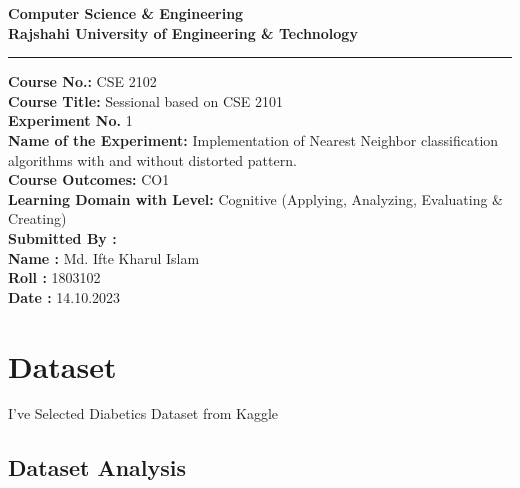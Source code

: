 \documentclass[12pt]{article}
\begin{document}
\thispagestyle{empty}
\begin{center}

\vspace{-12pt}
\end{center}
\setlength{\parskip}{0cm}

\begin{center}


\textbf{Computer Science \& Engineering\\
Rajshahi University of Engineering \& Technology}
\end{center}


\hrule 
\vspace{10pt}

\textbf{Course No.:} CSE 2102\\[1pt]
\textbf{Course Title:} Sessional based on CSE 2101\\[1pt]

\textbf{Experiment No.} 1\\[1pt]

\textbf{Name of the Experiment:} Implementation of Nearest Neighbor
classification algorithms with and without distorted pattern.\\[1pt]

\textbf{Course Outcomes:} CO1\\[1pt]

\textbf{Learning Domain with Level:} Cognitive (Applying, Analyzing,
Evaluating \& Creating)\\[2pt]

\textbf{Submitted By :}\\
\textbf{Name :} Md. Ifte Kharul Islam\\
\textbf{Roll :} 1803102\\
\textbf{Date :} 14.10.2023
\clearpage
{}


\newpage
\thispagestyle{empty}

\tableofcontents
\clearpage
{}
\newpage
\section{Dataset}
I've Selected Diabetics Dataset from Kaggle
\subsection{Dataset Analysis}
\end{document}
